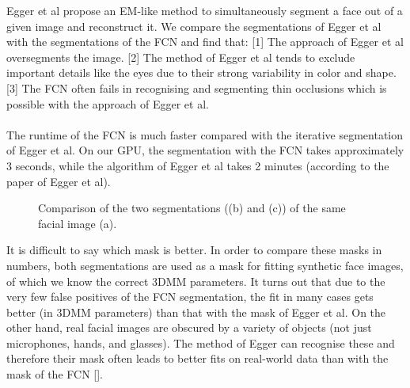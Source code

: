 Egger et al \cite{egger_paper} propose an EM-like method to simultaneously segment a face out of a given image and reconstruct it.
We compare the segmentations of Egger et al with the segmentations of the FCN and find that: [1] The approach of Egger et al oversegments the image. [2] The method of Egger et al tends to exclude important details like the eyes due to their strong variability in color and shape. [3] The FCN often fails in recognising and segmenting thin occlusions which is possible with the approach of Egger et al.\\
\\
The runtime of the FCN is much faster compared with the iterative segmentation of Egger et al. On our GPU, the segmentation with the FCN takes approximately 3 seconds, while the algorithm of Egger et al takes 2 minutes (according to the paper \cite{egger_paper} of Egger et al).

\begin{figure}
\centering
{}
\caption{Comparison of the two segmentations ((b) and (c)) of the same facial image (a).}
\label{fig:chap5:harry}
\end{figure}

It is difficult to say which mask is better. In order to compare these masks in numbers, both segmentations are used as a mask for fitting synthetic face images, of which we know the correct 3DMM parameters. It turns out that due to the very few false positives of the FCN segmentation, the fit in many cases gets better (in 3DMM parameters) than that with the mask of Egger et al. On the other hand, real facial images are obscured by a variety of objects (not just microphones, hands, and glasses). The method of Egger can recognise these and therefore their mask often leads to better fits on real-world data than with the mask of the FCN [].

